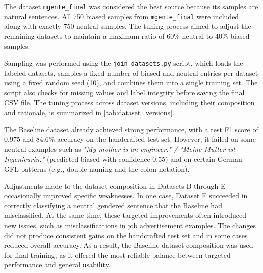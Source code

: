     The dataset \texttt{mgente\_final} was considered the best source because its samples are natural sentences. All 750 biased samples from \texttt{mgente\_final} were included, along with exactly 750 neutral samples. The tuning process aimed to adjust the remaining datasets to maintain a maximum ratio of 60\% neutral to 40\% biased samples.

    Sampling was performed using the \texttt{join\_datasets.py} script, which loads the labeled datasets, samples a fixed number of biased and neutral entries per dataset using a fixed random seed (10), and combines them into a single training set. The script also checks for missing values and label integrity before saving the final CSV file. The tuning process across dataset versions, including their composition and rationale, is summarized in \autoref{tab:dataset_versions}.

    The Baseline dataset already achieved strong performance, with a test F1 score of 0.975 and 84.6\% accuracy on the handcrafted test set. However, it failed on some neutral examples such as \textit{"My mother is an engineer." / "Meine Mutter ist Ingenieurin."} (predicted biased with confidence 0.55) and on certain German GFL patterns (e.g., double naming and the colon notation).

    Adjustments made to the dataset composition in Datasets B through E occasionally improved specific weaknesses. In one case, Dataset E succeeded in correctly classifying a neutral gendered sentence that the Baseline had misclassified. At the same time, these targeted improvements often introduced new issues, such as misclassifications in job advertisement examples. The changes did not produce consistent gains on the handcrafted test set and in some cases reduced overall accuracy. As a result, the Baseline dataset composition was used for final training, as it offered the most reliable balance between targeted performance and general usability.

